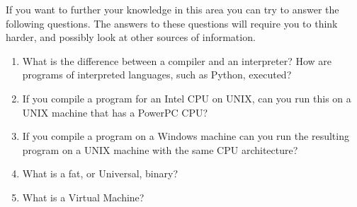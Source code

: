 \bigskip
If you want to further your knowledge in this area you can try to answer the following questions. The answers to these questions will require you to think harder, and possibly look at other sources of information.
\begin{enumerate}
  \item What is the difference between a compiler and an interpreter? How are programs of interpreted languages, such as Python, executed?
  \item If you compile a program for an Intel CPU on UNIX, can you run this on a UNIX machine that has a PowerPC CPU?
  \item If you compile a program on a Windows machine can you run the resulting program on a UNIX machine with the same CPU architecture?
  \item What is a fat, or Universal, binary?
  \item What is a Virtual Machine?
\end{enumerate}



